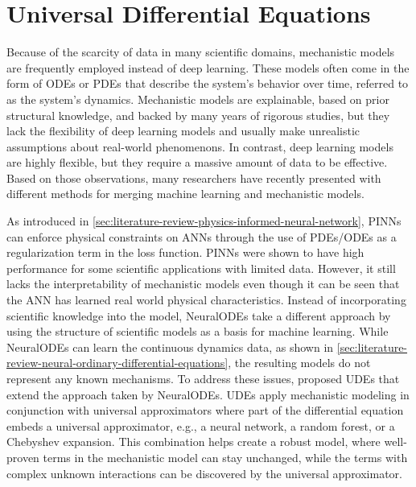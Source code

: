 \section{Universal Differential Equations}

Because of the scarcity of data in many scientific domains, mechanistic models are frequently employed instead of deep learning.
These models often come in the form of \glspl{ODE} or \glspl{PDE} that describe the system's behavior over time, referred to as the system's dynamics.
Mechanistic models are explainable, based on prior structural knowledge, and backed by many years of rigorous studies, but they lack the flexibility of deep learning models and usually make unrealistic assumptions about real-world phenomenons.
In contrast, deep learning models are highly flexible, but they require a massive amount of data to be effective.
Based on those observations, many researchers have recently presented with different methods for merging machine learning and mechanistic models.

As introduced in \autoref{sec:literature-review-physics-informed-neural-network}, \glspl{PINN} can enforce physical constraints on \glspl{ANN} through the use of \glspl{PDE}/\glspl{ODE} as a regularization term in the loss function.
\glspl{PINN} were shown to have high performance for some scientific applications with limited data.
However, it still lacks the interpretability of  mechanistic models even though it can be seen that the \gls{ANN} has learned real world physical characteristics.
Instead of incorporating scientific knowledge into the model, \glspl{NeuralODE} take a different approach by using the structure of scientific models as a basis for machine learning.
While \glspl{NeuralODE} can learn the continuous dynamics data, as shown in \autoref{sec:literature-review-neural-ordinary-differential-equations}, the resulting models do not represent any known mechanisms.
To address these issues, \citeauthor{rackauckasUniversalDifferentialEquations2020} \cite{rackauckasUniversalDifferentialEquations2020} proposed \glspl{UDE} that extend the approach taken by \glspl{NeuralODE}.
\glspl{UDE} apply mechanistic modeling in conjunction with universal approximators where part of the differential equation embeds a universal approximator, e.g., a neural network, a random forest, or a Chebyshev expansion.
This combination helps create a robust model, where well-proven terms in the mechanistic model can stay unchanged, while the terms with complex unknown interactions can be discovered by the universal approximator.

